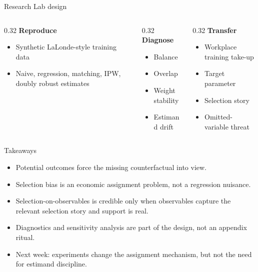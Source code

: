 \documentclass[aspectratio=169,11pt]{beamer}
\begin{document}
\begin{frame}{Research Lab design}
\begin{columns}[T,onlytextwidth]
\begin{column}{0.32\linewidth}
\textbf{Reproduce}
\begin{itemize}
    \item Synthetic LaLonde-style training data
    \item Naive, regression, matching, IPW, doubly robust estimates
\end{itemize}
\end{column}
\begin{column}{0.32\linewidth}
\textbf{Diagnose}
\begin{itemize}
    \item Balance
    \item Overlap
    \item Weight stability
    \item Estimand drift
\end{itemize}
\end{column}
\begin{column}{0.32\linewidth}
\textbf{Transfer}
\begin{itemize}
    \item Workplace training take-up
    \item Target parameter
    \item Selection story
    \item Omitted-variable threat
\end{itemize}
\end{column}
\end{columns}
\end{frame}

\begin{frame}{Takeaways}
\begin{itemize}
    \item Potential outcomes force the missing counterfactual into view.
    \item Selection bias is an economic assignment problem, not a regression nuisance.
    \item Selection-on-observables is credible only when observables capture the relevant selection story and support is real.
    \item Diagnostics and sensitivity analysis are part of the design, not an appendix ritual.
    \item Next week: experiments change the assignment mechanism, but not the need for estimand discipline.
\end{itemize}
\end{frame}
\end{document}
